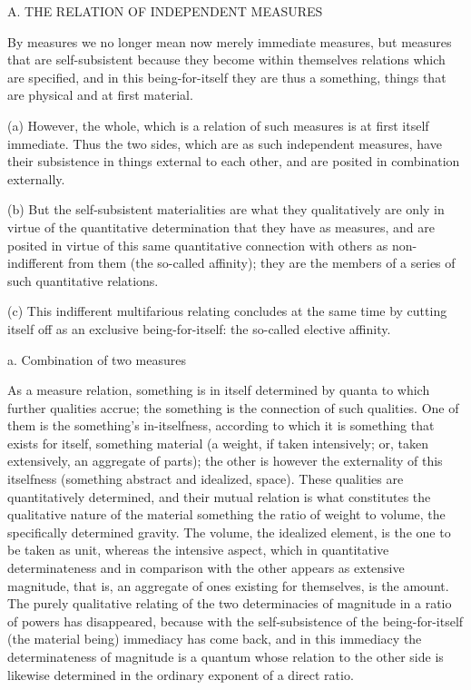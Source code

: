 
A. THE RELATION OF INDEPENDENT MEASURES

By measures we no longer mean now
merely immediate measures,
but measures that are self-subsistent
because they become within themselves
relations which are specified,
and in this being-for-itself
they are thus a something,
things that are physical
and at first material.

(a) However, the whole,
which is a relation of such measures
is at first itself immediate.
Thus the two sides,
which are as such independent measures,
have their subsistence in
things external to each other,
and are posited in combination externally.

(b) But the self-subsistent materialities are
what they qualitatively are only in virtue of
the quantitative determination that they have as measures,
and are posited in virtue of this same quantitative connection
with others as non-indifferent from them (the so-called affinity);
they are the members of a series of such quantitative relations.

(c) This indifferent multifarious relating
concludes at the same time by cutting itself off
as an exclusive being-for-itself:
the so-called elective affinity.

a. Combination of two measures

As a measure relation, something is in itself determined by
quanta to which further qualities accrue;
the something is the connection of such qualities.
One of them is the something's in-itselfness,
according to which it is something
that exists for itself, something material
(a weight, if taken intensively;
or, taken extensively, an aggregate of parts);
the other is however the externality of this itselfness
(something abstract and idealized, space).
These qualities are quantitatively determined,
and their mutual relation is what constitutes
the qualitative nature of the material something
the ratio of weight to volume, the specifically determined gravity.
The volume, the idealized element, is the one to be taken as unit,
whereas the intensive aspect,
which in quantitative determinateness
and in comparison with the other appears as extensive magnitude,
that is, an aggregate of ones existing for themselves, is the amount.
The purely qualitative relating of the two determinacies
of magnitude in a ratio of powers has disappeared,
because with the self-subsistence of the being-for-itself
(the material being) immediacy has come back,
and in this immediacy the determinateness
of magnitude is a quantum whose relation to the other side is likewise
determined in the ordinary exponent of a direct ratio.

